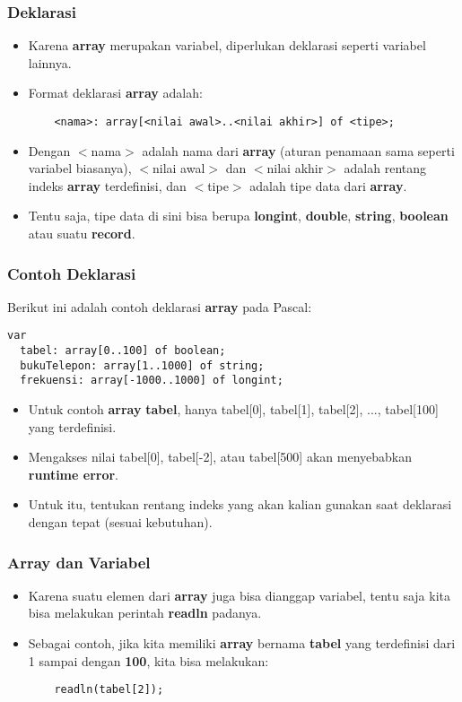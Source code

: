 \documentclass{beamer}
\begin{document}
\begin{frame}[fragile]
\frametitle{Deklarasi}
\begin{itemize}
	\item Karena \textbf{array} merupakan variabel, diperlukan deklarasi seperti variabel lainnya.
	\item Format deklarasi \textbf{array} adalah:
	\begin{lstlisting}
	<nama>: array[<nilai awal>..<nilai akhir>] of <tipe>;
	\end{lstlisting}
	\item Dengan $<$nama$>$ adalah nama dari \textbf{array} (aturan penamaan sama seperti variabel biasanya), $<$nilai awal$>$ dan $<$nilai akhir$>$ adalah rentang indeks \textbf{array} terdefinisi, dan $<$tipe$>$ adalah tipe data dari \textbf{array}.
	\item Tentu saja, tipe data di sini bisa berupa \textbf{longint}, \textbf{double}, \textbf{string}, \textbf{boolean} atau suatu \textbf{record}.
\end{itemize}
\end{frame}

\begin{frame}[fragile]
\frametitle{Contoh Deklarasi}
Berikut ini adalah contoh deklarasi \textbf{array} pada Pascal:
\begin{lstlisting}
var
  tabel: array[0..100] of boolean;
  bukuTelepon: array[1..1000] of string;
  frekuensi: array[-1000..1000] of longint;
\end{lstlisting}
\begin{itemize}
	\item Untuk contoh \textbf{array} \textbf{tabel}, hanya tabel[0], tabel[1], tabel[2], ..., tabel[100] yang terdefinisi.
	\item Mengakses nilai tabel[0], tabel[-2], atau tabel[500] akan menyebabkan \textbf{runtime error}.
	\item Untuk itu, tentukan rentang indeks yang akan kalian gunakan saat deklarasi dengan tepat (sesuai kebutuhan).
\end{itemize}
\end{frame}

\begin{frame}[fragile]
\frametitle{Array dan Variabel}
\begin{itemize}
	\item Karena suatu elemen dari \textbf{array} juga bisa dianggap variabel, tentu saja kita bisa melakukan perintah \textbf{readln} padanya.
	\item Sebagai contoh, jika kita memiliki \textbf{array} bernama \textbf{tabel} yang terdefinisi dari 1 sampai dengan \textbf{100}, kita bisa melakukan:
	\begin{lstlisting}
	readln(tabel[2]);
	\end{lstlisting}
\end{itemize}
\end{frame}
\end{document}
